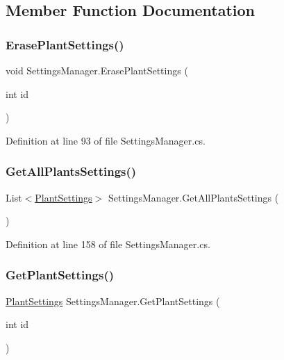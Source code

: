\subsection{Member Function Documentation}
\mbox{\label{class_settings_manager_a6e8b233eb4e8cae817131500068ea563}} 
\subsubsection{\texorpdfstring{ErasePlantSettings()}{ErasePlantSettings()}}
{\footnotesize\ttfamily void Settings\+Manager.\+Erase\+Plant\+Settings (\begin{DoxyParamCaption}\item[{int}]{id }\end{DoxyParamCaption})}



Definition at line 93 of file Settings\+Manager.\+cs.

\mbox{\label{class_settings_manager_a7e7845f2a734ad2114602b42e6d75e8e}} 
\subsubsection{\texorpdfstring{GetAllPlantsSettings()}{GetAllPlantsSettings()}}
{\footnotesize\ttfamily List$<$\mbox{\hyperlink{class_plant_settings}{Plant\+Settings}}$>$ Settings\+Manager.\+Get\+All\+Plants\+Settings (\begin{DoxyParamCaption}{ }\end{DoxyParamCaption})}



Definition at line 158 of file Settings\+Manager.\+cs.

\mbox{\label{class_settings_manager_a5c1c1fe4e33c799018dc41ac4ebde801}} 
\subsubsection{\texorpdfstring{GetPlantSettings()}{GetPlantSettings()}}
{\footnotesize\ttfamily \mbox{\hyperlink{class_plant_settings}{Plant\+Settings}} Settings\+Manager.\+Get\+Plant\+Settings (\begin{DoxyParamCaption}\item[{int}]{id }\end{DoxyParamCaption})}



